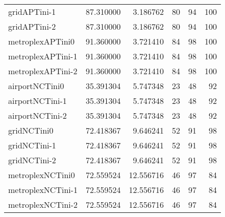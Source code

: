\begin{table}[h]
\begin{longtable}{lrrrrr}
gridAPTini-1 & 87.310000 & 3.186762 & 80 & 94 & 100 \\
gridAPTini-2 & 87.310000 & 3.186762 & 80 & 94 & 100 \\
metroplexAPTini0 & 91.360000 & 3.721410 & 84 & 98 & 100 \\
metroplexAPTini-1 & 91.360000 & 3.721410 & 84 & 98 & 100 \\
metroplexAPTini-2 & 91.360000 & 3.721410 & 84 & 98 & 100 \\
airportNCTini0 & 35.391304 & 5.747348 & 23 & 48 & 92 \\
airportNCTini-1 & 35.391304 & 5.747348 & 23 & 48 & 92 \\
airportNCTini-2 & 35.391304 & 5.747348 & 23 & 48 & 92 \\
gridNCTini0 & 72.418367 & 9.646241 & 52 & 91 & 98 \\
gridNCTini-1 & 72.418367 & 9.646241 & 52 & 91 & 98 \\
gridNCTini-2 & 72.418367 & 9.646241 & 52 & 91 & 98 \\
metroplexNCTini0 & 72.559524 & 12.556716 & 46 & 97 & 84 \\
metroplexNCTini-1 & 72.559524 & 12.556716 & 46 & 97 & 84 \\
metroplexNCTini-2 & 72.559524 & 12.556716 & 46 & 97 & 84 \\
\end{longtable}
\end{table}

